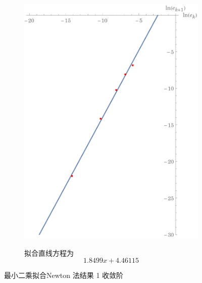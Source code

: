 \documentclass[11pt]{article}
\begin{document}
\begin{figure}[h]
\begin{subfigure}{\textwidth}
{\begin{tabular}{|c|c|c|c|c|}
                \hline
            \end{tabular}
        }
        \label{table:Newton-LS1}
    \end{subfigure}
    \begin{subfigure}{.49\textwidth}
        \centering
        \includegraphics[scale = 0.5]{Figure/收敛阶-Newton1.pdf}
        \label{figure:Newton-LS1}
    \end{subfigure}
    \begin{subfigure}{.49\textwidth}
        \centering
        拟合直线方程为
        \begin{equation*}
            1.8499 x + 4.46115
        \end{equation*}
    \end{subfigure}
    \caption{最小二乘拟合Newton 法结果 1 收敛阶}
    \label{Newton-LS1}
\end{figure}
\end{document}
